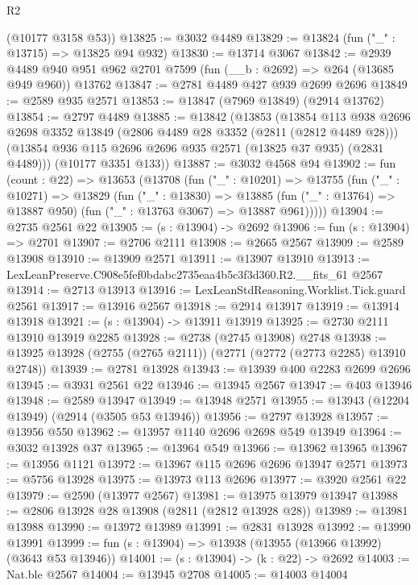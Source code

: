 \begin{lexlean}{R2}
\begin{coremodule}
      (@10177 @3158 @53))
@13825 := @3032 @4489
@13829 := @13824 (fun ("_" : @13715) => @13825 @94 @932)
@13830 := @13714 @3067
@13842 := @2939
    @4489
    @940
    @951
    @962
    @2701
    @7599
    (fun (__b : @2692) => @264 (@13685 @949 @960))
    @13762
@13847 := @2781 @4489 @427 @939 @2699 @2696
@13849 := @2589 @935 @2571
@13853 := @13847 (@7969 @13849) (@2914 @13762)
@13854 := @2797 @4489
@13885 := @13842
    (@13853
      (@13854
        @113
        @938
        @2696
        @2698
        @3352
        @13849
        (@2806 @4489 @28 @3352 (@2811 (@2812 @4489 @28)))
        (@13854 @936 @115 @2696 @2696 @935 @2571 (@13825 @37 @935) (@2831 @4489)))
      (@10177 @3351 @133))
@13887 := @3032 @4568 @94
@13902 := fun (count : @22) =>
  @13653
    (@13708
      (fun ("_" : @10201) =>
      @13755
        (fun ("_" : @10271) =>
        @13829
          (fun ("_" : @13830) =>
          @13885 (fun ("_" : @13764) => @13887 @950) (fun ("_" : @13763 @3067) => @13887 @961)))))
@13904 := @2735 @2561 @22
@13905 := (s : @13904) -> @2692
@13906 := fun (s : @13904) => @2701
@13907 := @2706 @2111
@13908 := @2665 @2567
@13909 := @2589 @13908
@13910 := @13909 @2571
@13911 := @13907 @13910
@13913 := LexLeanPreserve.C908e5fef0bdabc2735eaa4b5c3f3d360.R2.__fits_61 @2567
@13914 := @2713 @13913
@13916 := LexLeanStdReasoning.Worklist.Tick.guard @2561
@13917 := @13916 @2567
@13918 := @2914 @13917
@13919 := @13914 @13918
@13921 := (s : @13904) -> @13911 @13919
@13925 := @2730 @2111 @13910 @13919 @2285
@13928 := @2738 (@2745 @13908) @2748
@13938 := @13925 @13928 (@2755 (@2765 @2111)) (@2771 (@2772 (@2773 @2285) @13910 @2748))
@13939 := @2781 @13928
@13943 := @13939 @400 @2283 @2699 @2696
@13945 := @3931 @2561 @22
@13946 := @13945 @2567
@13947 := @403 @13946
@13948 := @2589 @13947
@13949 := @13948 @2571
@13955 := @13943 (@12204 @13949) (@2914 (@3505 @53 @13946))
@13956 := @2797 @13928
@13957 := @13956 @550
@13962 := @13957 @1140 @2696 @2698 @549 @13949
@13964 := @3032 @13928 @37
@13965 := @13964 @549
@13966 := @13962 @13965
@13967 := @13956 @1121
@13972 := @13967 @115 @2696 @2696 @13947 @2571
@13973 := @5756 @13928
@13975 := @13973 @113 @2696
@13977 := @3920 @2561 @22
@13979 := @2590 (@13977 @2567)
@13981 := @13975 @13979 @13947
@13988 := @2806 @13928 @28 @13908 (@2811 (@2812 @13928 @28))
@13989 := @13981 @13988
@13990 := @13972 @13989
@13991 := @2831 @13928
@13992 := @13990 @13991
@13999 := fun (s : @13904) => @13938 (@13955 (@13966 @13992) (@3643 @53 @13946))
@14001 := (s : @13904) -> (k : @22) -> @2692
@14003 := Nat.ble @2567
@14004 := @13945 @2708
@14005 := @14003 @14004

\end{coremodule}
\end{lexlean}
